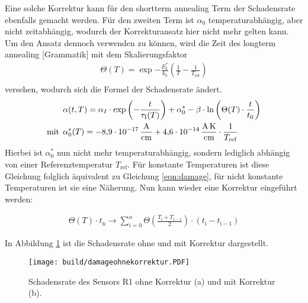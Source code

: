 Eine solche Korrektur kann für den shortterm annealing Term der Schadensrate ebenfalls gemacht werden.
Für den zweiten Term ist $\alpha_{0}$ temperaturabhängig, aber nicht zeitabhängig,
wodurch der Korrekturansatz hier nicht mehr gelten kann. Um den Ansatz dennoch
verwenden zu können, wird die Zeit des longterm annealing [Grammatik] mit dem
Skalierungsfaktor
\begin{align}
  \Theta(T) =  \exp{-\frac{E_{\mathrm{I}}^*}{k_b}\left(\frac{1}{T}-\frac{1}{T_{\mathrm{ref}}}\right)} \\
\end{align}
versehen, wodurch sich die Formel der Schadensrate ändert.
\begin{align}
  &\alpha(t, T) = \alpha_I \cdot \exp{\left(-\frac{t}{\tau_{\mathrm{I}}(T)}\right)} + \alpha_{\mathrm{0}}^{*} -\beta \cdot \ln{\left(\Theta(T) \cdot \frac{t}{t_{\mathrm{0}}}\right)} \\
  \medskip
  \text{mit}\:\: &\alpha^*_{\mathrm{0}}(T) = \SI{-8.9e-17}{\ampere\per\centi\meter} + \SI{4.6e-14}{\ampere\kelvin\per\centi\meter} \cdot \frac{1}{T_{\mathrm{ref}}}
\end{align}
Hierbei ist $\alpha^*_{0}$ nun nicht mehr temperaturabhängig,
sondern lediglich abhängig von einer Referenztemperatur $T_{\mathrm{ref}}$. Für konstante Temperaturen
ist diese Gleichung folglich äquivalent zu Gleichung \ref{eqn:damage}, für nicht
konstante Temperaturen ist sie eine Näherung.
Nun kann wieder eine Korrektur eingeführt werden:

\begin{align}
  \Theta(T) \cdot t_{\mathrm{n}} \rightarrow \sum_{i=0}^n   \Theta \left(\frac{T_{\mathrm{i}} +T_{\mathrm{i-1}}}{2}\right) \cdot  (t_{\mathrm{i}} - t_{\mathrm{i-1}})
\end{align}

In Abbildung \ref{fig:korrektur_damage} ist die Schadensrate ohne und mit Korrektur
dargestellt.

\begin{figure}
    \texttt{[image: build/damageohnekorrektur.PDF]}
\caption{Schadensrate des Sensors R1 ohne Korrektur (a) und mit Korrektur (b).}
\label{fig:korrektur_damage}
\end{figure}


